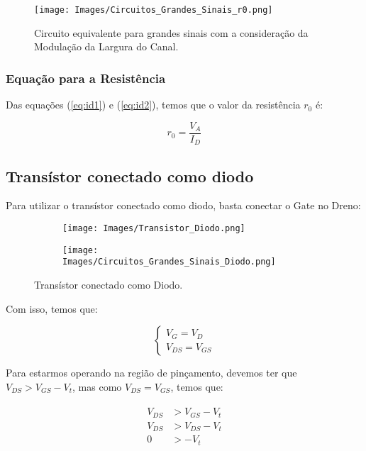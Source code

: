 \documentclass[12pt]{article}
\begin{document}
\begin{figure}[H]
  \begin{center}
    \texttt{[image: Images/Circuitos\_Grandes\_Sinais\_r0.png]}
  \end{center}
  \caption{Circuito equivalente para grandes sinais com a consideração da Modulação da Largura do Canal.}
  \label{fig:circuito_grandes_sinais}
\end{figure}

\subsubsection{Equação para a Resistência}

Das equações (\ref{eq:id1}) e (\ref{eq:id2}), temos que o valor da resistência $r_0$ é:

$$
  r_0 = \frac{V_A}{I_D}
$$

\subsection{Transístor conectado como diodo}

Para utilizar o transístor conectado como diodo, basta conectar o Gate no Dreno:


\begin{figure}[H]
  \centering
  \begin{subfigure}{.3\linewidth}
    \centering
    \texttt{[image: Images/Transistor\_Diodo.png]}
  \end{subfigure}%
  \begin{subfigure}{.7\linewidth}
    \centering
    \texttt{[image: Images/Circuitos\_Grandes\_Sinais\_Diodo.png]}
  \end{subfigure}
  \caption{Transístor conectado como Diodo.}
  \end{figure}

Com isso, temos que:

$$
\begin{cases}
  V_G = V_D \\
  V_{DS} = V_{GS}
\end{cases}
$$

Para estarmos operando na região de pinçamento, devemos ter que $V_{DS} > V_{GS} - V_t$, mas como $V_{DS} = V_{GS}$, temos que:

\begin{align}
  \begin{split}
    V_{DS} &> V_{GS} - V_t \\
    V_{DS} &> V_{DS} - V_t \\
    0 &> -V_t
  \end{split}
\end{align}
\end{document}
